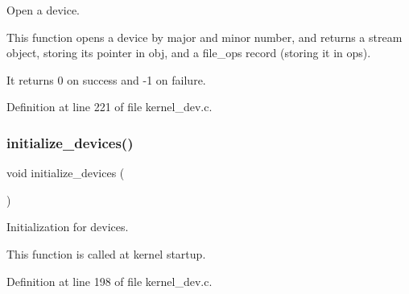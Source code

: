 Open a device. 

This function opens a device by major and minor number, and returns a stream object, storing its pointer in {\ttfamily obj}, and a {\ttfamily file\+\_\+ops} record (storing it in {\ttfamily ops}).

It returns 0 on success and -\/1 on failure. 

Definition at line 221 of file kernel\+\_\+dev.\+c.

\mbox{\label{group__dev_ga840b5c2460abea4a19a201f7d6d035c8}} 
\subsubsection{\texorpdfstring{initialize\+\_\+devices()}{initialize\_devices()}}
{\footnotesize\ttfamily void initialize\+\_\+devices (\begin{DoxyParamCaption}{ }\end{DoxyParamCaption})}



Initialization for devices. 

This function is called at kernel startup. 

Definition at line 198 of file kernel\+\_\+dev.\+c.

